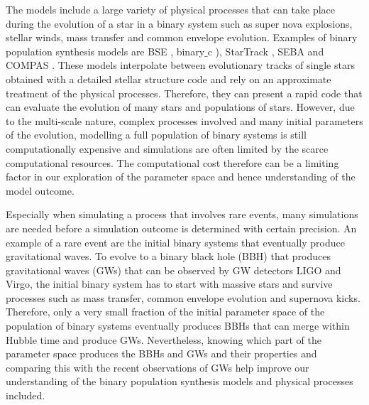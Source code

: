 \documentclass[a4paper,fleqn,usenatbib]{mnras}
\begin{document}
The models include a large variety of physical processes that can take place during the evolution of a star in a binary system such as super nova explosions, stellar winds, mass transfer and common envelope evolution. Examples of binary population synthesis models are  BSE \citep{hurley2000comprehensive,hurley2002evolution}, binary$\_$c \citep{izzard2004new, izzard2009population}), StarTrack \citep{belczynski2008compact}, SEBA \citep{portegies1996population,verbunt1996high} and COMPAS \citep{stevenson2017formation}. These models interpolate between evolutionary tracks of single stars obtained with a detailed stellar structure code \citep{pols1998stellar} and rely on an approximate treatment of the physical processes. 
Therefore, they can present a rapid code that can evaluate the evolution of many stars and populations of stars. However, due to the multi-scale nature, complex processes involved and many initial parameters of the evolution, modelling a full population of binary systems is still computationally expensive and simulations are often limited by the scarce computational resources.  
The computational cost therefore can be a limiting factor in our exploration of the parameter space and hence understanding of the model outcome.

Especially when simulating a process that involves rare events, many simulations are needed before a simulation outcome is determined with certain precision. An example of a rare event are the initial binary systems that eventually produce gravitational waves. To evolve to a binary black hole (BBH) that produces gravitational waves (GWs) that can be observed by GW detectors LIGO and Virgo, the initial binary system has to start with massive stars and survive processes such as mass transfer, common envelope evolution and supernova kicks. Therefore, only a very small fraction of the initial parameter space of the population of binary systems eventually produces BBHs that can merge within Hubble time and produce GWs.  Nevertheless, knowing which part of the parameter space produces the BBHs and GWs and their properties and comparing this with the recent observations of GWs \citep{abbott2016observation} help improve our understanding of the binary population synthesis models and physical processes included.  
\end{document}
